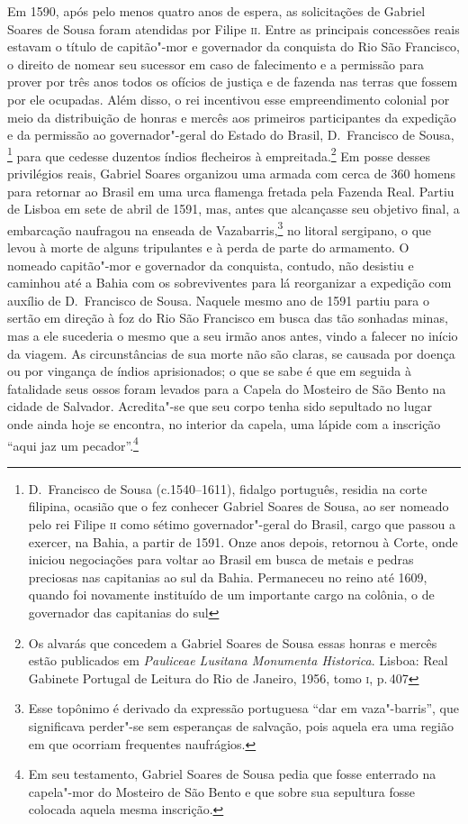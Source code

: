 \documentclass[12pt]{extarticle}
\begin{document}
Em 1590, após pelo menos quatro anos de espera, as solicitações de
Gabriel Soares de Sousa foram atendidas por Filipe \textsc{ii}. Entre as
principais concessões reais estavam o título de capitão"-mor e
governador da conquista do Rio São Francisco, o direito de nomear seu
sucessor em caso de falecimento e a permissão para prover por três anos
todos os ofícios de justiça e de fazenda nas terras que fossem por ele
ocupadas. Além disso, o rei incentivou esse empreendimento colonial por
meio da distribuição de honras e mercês aos primeiros participantes da
expedição e da permissão ao governador"-geral do Estado do Brasil, D.~Francisco de Sousa,
\footnote{ D.~Francisco de Sousa (c.1540--1611),
fidalgo português, residia na corte filipina, ocasião que o fez
conhecer Gabriel Soares de Sousa, ao ser nomeado pelo rei Filipe \textsc{ii}
como sétimo governador"-geral do Brasil, cargo que passou a exercer, na
Bahia, a partir de 1591. Onze anos depois, retornou à Corte, onde
iniciou negociações para voltar ao Brasil em busca de metais e pedras
preciosas nas capitanias ao sul da Bahia. Permaneceu no reino até 1609,
quando foi novamente instituído de um importante cargo na colônia, o de
governador das capitanias do sul} para que cedesse duzentos índios
flecheiros à empreitada.\footnote{ Os alvarás que concedem a Gabriel
Soares de Sousa essas honras e mercês estão publicados em \textit{
Pauliceae Lusitana Monumenta Historica}. Lisboa: Real Gabinete Portugal
de Leitura do Rio de Janeiro, 1956, tomo \textsc{i}, p.\,407} Em posse
desses privilégios reais, Gabriel Soares organizou uma armada com cerca
de 360 homens para retornar ao Brasil em uma urca
flamenga fretada pela Fazenda Real. Partiu de Lisboa em sete de abril
de 1591, mas, antes que alcançasse seu objetivo final, a embarcação
naufragou na enseada de Vazabarris,\footnote{ Esse topônimo é derivado
da expressão portuguesa “dar em vaza"-barris”, que significava perder"-se
sem esperanças de salvação, pois aquela era uma região em que ocorriam
frequentes naufrágios.} no litoral sergipano, o que levou à morte de
alguns tripulantes e à perda de parte do armamento. O nomeado
capitão"-mor e governador da conquista, contudo, não desistiu e caminhou
até a Bahia com os sobreviventes para lá reorganizar a expedição com
auxílio de D.~Francisco de Sousa. Naquele mesmo ano de 1591 partiu para
o sertão em direção à foz do Rio São Francisco em busca das tão
sonhadas minas, mas a ele sucederia o mesmo que a seu irmão anos antes,
vindo a falecer no início da viagem. As circunstâncias de sua morte não
são claras, se causada por doença ou por vingança de índios
aprisionados; o que se sabe é que em seguida à fatalidade seus ossos
foram levados para a Capela do Mosteiro de São Bento na cidade de
Salvador. Acredita"-se que seu corpo tenha sido sepultado no lugar onde
ainda hoje se encontra, no interior da capela, uma lápide com a
inscrição ``aqui jaz um pecador''.\footnote{Em seu
testamento, Gabriel Soares de Sousa pedia que fosse enterrado na 
capela"-mor do Mosteiro de São Bento e que sobre sua sepultura fosse colocada
aquela mesma inscrição.}
\end{document}
